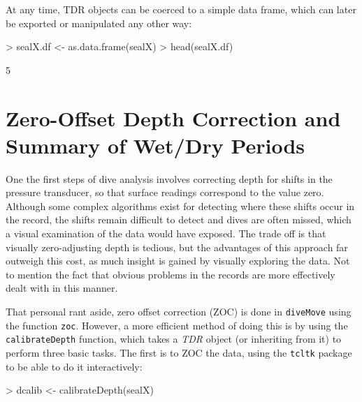 \documentclass[12pt, letterpaper]{scrartcl}
\newcommand{\Rfunction}[1]{{\texttt{#1}}}
\newcommand{\Rpackage}[1]{{\texttt{#1}}}
\newcommand{\Rclass}[1]{{\textit{#1}}}
\begin{document}
At any time, TDR objects can be coerced to a simple data frame, which can
later be exported or manipulated any other way:
\begin{Schunk}
\begin{Sinput}
> sealX.df <- as.data.frame(sealX)
> head(sealX.df)
\end{Sinput}
\begin{Soutput}
[1] 5
\end{Soutput}
\end{Schunk}


\section[ZOC and Wet/Dry period detection]{Zero-Offset Depth Correction
  and Summary of Wet/Dry Periods}
\label{sec:zoc}

One the first steps of dive analysis involves correcting depth for shifts
in the pressure transducer, so that surface readings correspond to the
value zero.  Although some complex algorithms exist for detecting where
these shifts occur in the record, the shifts remain difficult to detect
and dives are often missed, which a visual examination of the data would
have exposed.  The trade off is that visually zero-adjusting depth is
tedious, but the advantages of this approach far outweigh this cost, as
much insight is gained by visually exploring the data.  Not to mention the
fact that obvious problems in the records are more effectively dealt with
in this manner.

That personal rant aside, zero offset correction (ZOC) is done in
\Rpackage{diveMove} using the function \Rfunction{zoc}.  However, a more
efficient method of doing this is by using the \Rfunction{calibrateDepth}
function, which takes a \Rclass{TDR} object (or inheriting from it) to
perform three basic tasks.  The first is to ZOC the data, using the
\Rpackage{tcltk} package to be able to do it interactively:
\begin{Schunk}
\begin{Sinput}
> dcalib <- calibrateDepth(sealX)
\end{Sinput}
\end{Schunk}
\end{document}
